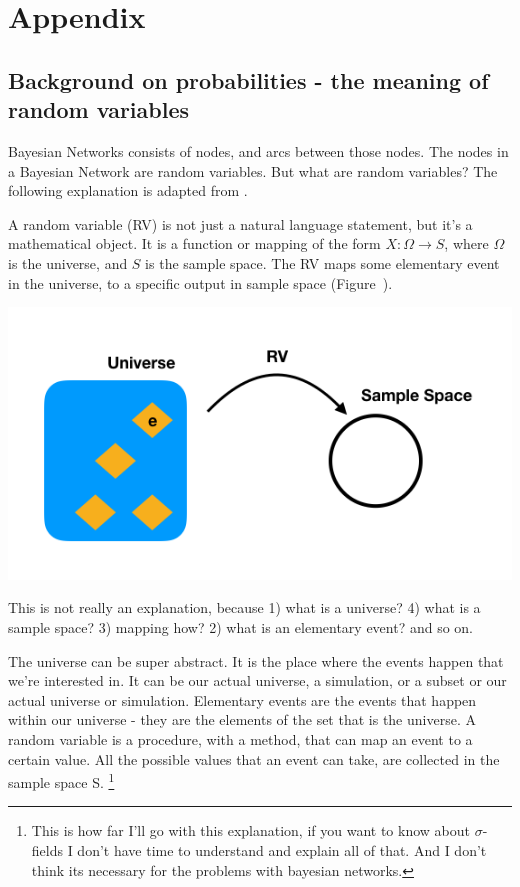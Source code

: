 
\chapter[Appendix]{Appendix}
\section{Background on probabilities - the meaning of random variables}

Bayesian Networks consists of nodes, and arcs between those nodes. The nodes in a Bayesian Network are random variables. But what are random variables? The following explanation is adapted from \citep{Jaeger2019}.

A random variable (RV) is not just a natural language statement, but it's a mathematical object. It is a function or mapping of the form $X : \Omega \rightarrow S$, where $\Omega$ is the universe, and $S$ is the sample space. The RV maps some elementary event in the universe, to a specific output in sample space (Figure~).


\includegraphics[width=\linewidth]{images/rv1.png}


This is not really an explanation, because 1) what is a universe? 4) what is a sample space? 3) mapping how? 2) what is an elementary event? and so on.

The universe can be super abstract. It is the place where the events happen that we're interested in. It can be our actual universe, a simulation, or a subset or our actual universe or simulation. Elementary events are the events that happen within our universe - they are the elements of the set that is the universe. A random variable is a procedure, with a method, that can map an event to a certain value. All the possible values that an event can take, are collected in the sample space S. \footnote{This is how far I'll go with this explanation, if you want to know about $\sigma$-fields I don't have time to understand and explain all of that. And I don't think its necessary for the problems with bayesian networks.}

